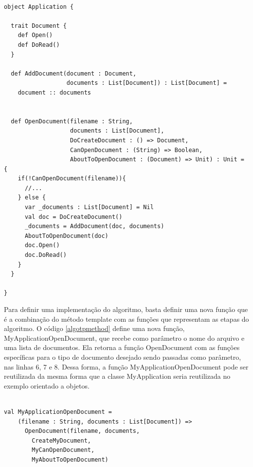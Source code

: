 \begin{lstlisting}[caption={Template Method Funcional},label=fptpmethod]
    
object Application {

  trait Document {
    def Open()
    def DoRead()
  }

  def AddDocument(document : Document,
                  documents : List[Document]) : List[Document] =
    document :: documents


  def OpenDocument(filename : String,
                   documents : List[Document],
                   DoCreateDocument : () => Document,
                   CanOpenDocument : (String) => Boolean,
                   AboutToOpenDocument : (Document) => Unit) : Unit = {
    if(!CanOpenDocument(filename)){
      //...
    } else {
      var _documents : List[Document] = Nil
      val doc = DoCreateDocument()
      _documents = AddDocument(doc, documents)
      AboutToOpenDocument(doc)
      doc.Open()
      doc.DoRead()
    }
  }

}

\end{lstlisting}

Para definir uma implementação do algoritmo, basta 
definir uma nova função que é a combinação do método 
template com as funções que representam as etapas do 
algoritmo. O código \ref{algotpmethod} define uma 
nova função, MyApplicationOpenDocument, que recebe 
como parâmetro o nome do arquivo e uma lista de 
documentos. Ela retorna a função OpenDocument com as 
funções específicas para o tipo de documento 
desejado sendo passadas como parâmetro, nas linhas 
6, 7 e 8. Dessa forma, a função MyApplicationOpenDocument 
pode ser reutilizada da mesma forma que a classe 
MyApplication seria reutilizada no exemplo orientado 
a objetos.

\begin{lstlisting}[caption={Definição do algoritmo},label=algotpmethod]
    
val MyApplicationOpenDocument = 
    (filename : String, documents : List[Document]) => 
      OpenDocument(filename, documents,
        CreateMyDocument,
        MyCanOpenDocument,
        MyAboutToOpenDocument)

\end{lstlisting}

